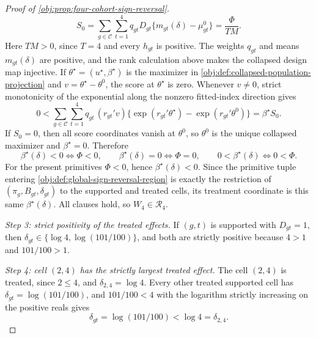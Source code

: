\begin{proof}[Proof of \cref{obj:prop:four-cohort-sign-reversal}]
\[
S_0
=
\sum_{g\in\mathcal C}\sum_{t=1}^4
q_{gt}D_{gt}\{m_{gt}(\delta)-\mu^0_{gt}\}
=
\frac{\Phi}{T M} .
\]
Here \(TM>0\), since \(T=4\) and every \(h_{gt}\) is positive. The weights \(q_{gt}\) and means \(m_{gt}(\delta)\) are positive, and the rank calculation above makes the collapsed design map injective. If \(\theta^\star=(u^\star,\beta^\star)\) is the maximizer in \cref{obj:def:collapsed-population-projection} and \(v=\theta^\star-\theta^0\), the score at \(\theta^\star\) is zero. Whenever \(v\neq0\), strict monotonicity of the exponential along the nonzero fitted-index direction gives
\[
0<
\sum_{g\in\mathcal C}\sum_{t=1}^4
q_{gt}\,(r_{gt}'v)\{\exp(r_{gt}'\theta^\star)-\exp(r_{gt}'\theta^0)\}
=\beta^\star S_0 .
\]
If \(S_0=0\), then all score coordinates vanish at \(\theta^0\), so \(\theta^0\) is the unique collapsed maximizer and \(\beta^\star=0\). Therefore
\[
\beta^\star(\delta)<0\iff\Phi<0,
\qquad
\beta^\star(\delta)=0\iff\Phi=0,
\qquad
0<\beta^\star(\delta)\iff0<\Phi .
\]
For the present primitives \(\Phi<0\), hence \(\beta^\star(\delta)<0\).
Since the primitive tuple entering \cref{obj:def:global-sign-reversal-region} is exactly the restriction of \((\pi_g,B_{gt},\delta_{gt})\) to the supported and treated cells, its treatment coordinate is this same \(\beta^\star(\delta)\). All clauses hold, so \(W_4\in\mathcal R_4\).

\textit{Step 3: strict positivity of the treated effects.} If \((g,t)\) is supported with \(D_{gt}=1\), then \(\delta_{gt}\in\{\log 4,\log(101/100)\}\), and both are strictly positive because \(4>1\) and \(101/100>1\).

\textit{Step 4: cell \((2,4)\) has the strictly largest treated effect.} The cell \((2,4)\) is treated, since \(2\le 4\), and \(\delta_{2,4}=\log4\). Every other treated supported cell has \(\delta_{gt}=\log(101/100)\), and \(101/100<4\) with the logarithm strictly increasing on the positive reals gives
\[
\delta_{gt}=\log(101/100)<\log4=\delta_{2,4}.
\]


\end{proof}
